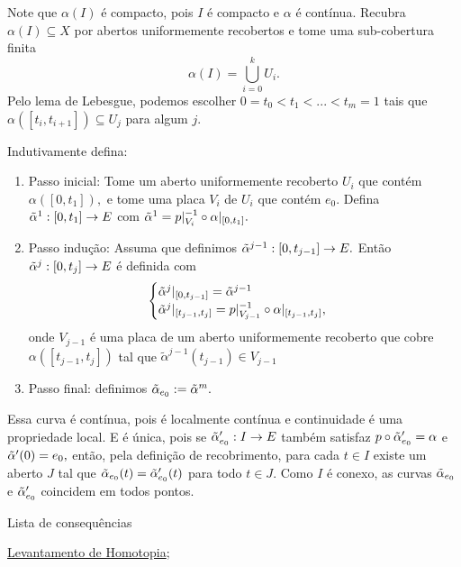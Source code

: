 \begin{dem}
    Note que $\alpha(I)$ é compacto, pois $I$ é compacto e $\alpha$ é contínua. Recubra $\alpha(I)\subseteq X$ por abertos uniformemente recobertos e tome uma sub-cobertura finita
    \[\alpha(I)=\bigcup_{i=0}^k U_i. \]
    Pelo lema de Lebesgue, podemos escolher $0=t_0< t_1<...<t_m=1$ tais que $\alpha([t_i,t_{i+1}])\subseteq U_j$ para algum $j.$ 
    
    Indutivamente defina: 
    \begin{enumerate}
        \item Passo inicial: Tome um aberto uniformemente recoberto $U_i$ que contém $\alpha([0,t_1]),$ e tome uma placa $V_i$ de $U_i$ que contém $e_0.$ Defina $\Tilde{\alpha}^1:[0,t_1]\rightarrow E$ com $\Tilde{\alpha}^1=p|_{V_i}^{-1}\circ \alpha|_{[0,t_1]}.$
        \item Passo indução: Assuma que definimos $\Tilde{\alpha}^{j-1}:[0,t_{j-1}]\rightarrow E.$ Então $\Tilde{\alpha}^j:[0,t_j]\rightarrow E$ é definida com 
        \begin{align*}
            \begin{cases}
                \Tilde{\alpha}^j|_{[0,t_{j-1}]}=\Tilde{\alpha}^{j-1}\\
                \Tilde{\alpha}^j|_{[t_{j-1},t_j]}=p|_{V_{j-1}}^{-1}\circ \alpha|_{[t_{j-1},t_j]},
            \end{cases}
        \end{align*}
        onde $V_{j-1}$ é uma placa de um aberto uniformemente recoberto que cobre $\alpha([t_{j-1},t_j])$ tal que $\tilde{\alpha}^{j-1}(t_{j-1})\in V_{j-1}$
        \item Passo final: definimos $\Tilde{\alpha}_{e_0}:=\Tilde{\alpha}^m.$
    \end{enumerate}

    Essa curva é contínua, pois é localmente contínua e continuidade é uma propriedade local. E é única, pois se $\Tilde{\alpha}_{e_0}':I\rightarrow E$ também satisfaz $p\circ\Tilde{\alpha}_{e_0}'=\alpha$ e $\Tilde{\alpha}'(0)=e_0,$ então, pela definição de recobrimento, para cada $t\in I$ existe um aberto $J$ tal que $\Tilde{\alpha}_{e_0}(t)=\Tilde{\alpha}_{e_0}'(t)$ para todo $t\in J$. Como $I$ é conexo, as curvas $\Tilde{\alpha}_{e_0}$ e $\Tilde{\alpha}_{e_0}'$ coincidem em todos pontos.
\end{dem}

\begin{titlemize}{Lista de consequências}
	\item \hyperref[levantamento-de-homotopia-prop]{Levantamento de Homotopia};\\ %
\end{titlemize}
